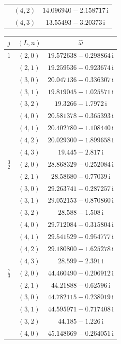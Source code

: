 \begin{table}[H]
\begin{minipage}[t]{0.325\textwidth}
\begin{tabular}[t]{|c|c|c|}
 & $(4,2)$ & $14.096940-2.158717\,\mathrm{i}$ \\
 & $(4,3)$ & $13.55493-3.20373\,\mathrm{i}$ \\
\hline
\end{tabular}
\end{minipage}\hfill
\begin{minipage}[t]{0.325\textwidth}
\centering
\begin{tabular}[t]{|c|c|c|}
\hline
$j$ & $(L,n)$ & $\widehat{\omega}$ \\
\hline
$1$ & $(2,0)$ & $19.572638-0.298864\,\mathrm{i}$ \\
 & $(2,1)$ & $19.259536-0.923674\,\mathrm{i}$ \\
 & $(3,0)$ & $20.047136-0.336307\,\mathrm{i}$ \\
 & $(3,1)$ & $19.819045-1.025571\,\mathrm{i}$ \\
 & $(3,2)$ & $19.3266-1.7972\,\mathrm{i}$ \\
 & $(4,0)$ & $20.581378-0.365393\,\mathrm{i}$ \\
 & $(4,1)$ & $20.402780-1.108440\,\mathrm{i}$ \\
 & $(4,2)$ & $20.029300-1.899658\,\mathrm{i}$ \\
 & $(4,3)$ & $19.445-2.817\,\mathrm{i}$ \\
\hline
$\tfrac32$ & $(2,0)$ & $28.868329-0.252084\,\mathrm{i}$ \\
 & $(2,1)$ & $28.58680-0.77039\,\mathrm{i}$ \\
 & $(3,0)$ & $29.263741-0.287257\,\mathrm{i}$ \\
 & $(3,1)$ & $29.052153-0.870860\,\mathrm{i}$ \\
 & $(3,2)$ & $28.588-1.508\,\mathrm{i}$ \\
 & $(4,0)$ & $29.712084-0.315804\,\mathrm{i}$ \\
 & $(4,1)$ & $29.541529-0.954777\,\mathrm{i}$ \\
 & $(4,2)$ & $29.180800-1.625278\,\mathrm{i}$ \\
 & $(4,3)$ & $28.599-2.391\,\mathrm{i}$ \\
\hline
$\tfrac73$ & $(2,0)$ & $44.460490-0.206912\,\mathrm{i}$ \\
 & $(2,1)$ & $44.21888-0.62596\,\mathrm{i}$ \\
 & $(3,0)$ & $44.782115-0.238019\,\mathrm{i}$ \\
 & $(3,1)$ & $44.595971-0.717408\,\mathrm{i}$ \\
 & $(3,2)$ & $44.185-1.226\,\mathrm{i}$ \\
 & $(4,0)$ & $45.148669-0.264051\,\mathrm{i}$ \\

\end{tabular}
\end{minipage}
\end{table}
